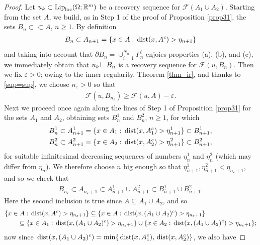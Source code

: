 \documentclass[a4paper,11pt]{article}
\numberwithin{equation}{section}
\newcommand{\Om}{\Omega}
\def\dist{\,{\rm dist}}
\newcommand{\R}{\mathbb{R}}
\newcommand{\res}      {\mathop{\hbox{\vrule height 7pt width .5pt depth
                        0pt\vrule height .5pt width 6pt depth 0pt}}\nolimits}
\begin{document}
\begin{proof}
Let $u_k\subset{\text{{\rm Lip}}}_{\text{{\rm loc}}}(\Om;\R^m)$ be a recovery sequence for $\mathcal F(A_1\cup A_2)$. Starting from the set $A$, we build, as in Step 1 of the proof of Proposition \ref{prop31}, the sets $B_n\subset\subset A$, $n\geq1$. By definition
\begin{align}
B_n\subset A_{n+1}=\{x\in A:\dist(x,A^c)>\eta_{n+1}\}
\end{align}
and taking into account that $\partial B_n=\cup_{i=1}^{N_n}\Gamma_n^i$ enjoies properties (a), (b), and (c), we immediately obtain that $u_k\res B_n$ is a recovery sequence for $\mathcal F(u,B_n)$. Then we fix $\varepsilon>0$; owing to the inner regularity, Theorem \ref{thm_ir}, and thanks to \eqref{sup=sup}, we  choose  $n_\varepsilon>0$ so that 
\begin{align}\label{pi}
\mathcal F(u,B_{n_\varepsilon})\geq \mathcal F(u,A)-\varepsilon.
\end{align}
Next we proceed once again along the lines of Step 1 of Proposition \ref{prop31} for the sets $A_1$ and $A_2$, obtaining sets $B_n^1$ and $B_n^2$, $n\geq1$, for which
\begin{align*}
	&B^1_n\subset A^1_{n+1}=\{x\in A_1:\dist(x,A_1^c)>\eta^1_{n+1}\}\subset B^1_{n+1},\\
	&B^2_n\subset A^2_{n+1}=\{x\in A_2:\dist(x,A_2^c)>\eta^2_{n+1}\}\subset B^2_{n+1},	
\end{align*}
for suitable infinitesimal decreasing sequences of numbers $\eta_n^1$ and $\eta_n^2$ (which may differ from $\eta_n$). We therefore choose $\overline n$ big enough so that $\eta_{\overline n+1}^1,\eta_{\overline n+1}^2<\eta_{n_\varepsilon+1}$, and so we check that 
\begin{align}\label{315}
B_{n_\varepsilon}\subset A_{n_\varepsilon+1}\subset A^1_{\overline n+1}\cup A^2_{\overline n+1}\subset B^1_{\overline n+1}\cup B^2_{\overline n+1}.
\end{align}
Here the second inclusion is true since $A\subseteq A_1\cup A_2$, and so
\begin{align*}
&\{x\in A:\dist(x,A^c)>\eta_{n_\varepsilon+1}\}\subseteq  \{x\in A:\dist(x,(A_1\cup A_2)^c)>\eta_{n_\varepsilon+1}\}\\
&\qquad \subseteq  \{x\in A_1:\dist(x,(A_1\cup A_2)^c)>\eta_{n_\varepsilon+1}\}\cup  \{x\in A_2:\dist(x,(A_1\cup A_2)^c)>\eta_{n_\varepsilon+1}\};
\end{align*}
now since $\dist(x,(A_1\cup A_2)^c)=\min\{\dist(x,A_1^c),\dist(x,A_2^c)\}$, we also have

\end{proof}
\end{document}
